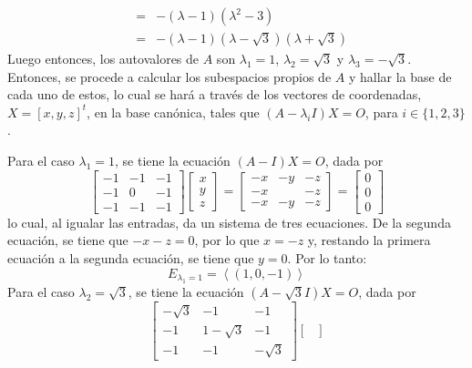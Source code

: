 \begin{solucion}
\begin{eqnarray*}
  & = & -(\lambda-1)(\lambda^2-3) \\ 
  & = & -(\lambda - 1)(\lambda - \sqrt{3})(\lambda + \sqrt{3})
 \end{eqnarray*}
 Luego entonces, los autovalores de $A$ son $\lambda_1 = 1$, $\lambda_2 = \sqrt{3}$ y $\lambda_3 = -\sqrt{3}$. Entonces, se procede a calcular los subespacios propios de $A$ y hallar la base de cada uno de estos, lo cual se har\'a a trav\'es de los vectores de coordenadas, $X=[x,y,z]^t$, en la base can\'onica, tales que $(A-\lambda_i I)X = O$, para $i \in \{ 1,2,3 \}$.
 \par 
 Para el caso $\lambda_1 = 1$, se tiene la ecuaci\'on $(A-I)X = O$, dada por
 \begin{equation*}
  \begin{bmatrix}
   -1 & -1 & -1 \\
   -1 &  0 & -1 \\
   -1 & -1 & -1
  \end{bmatrix}
  \begin{bmatrix}
   x \\ y \\ z
  \end{bmatrix}
  = 
  \begin{bmatrix}
   -x & -y & -z \\
   -x &    & -z \\
   -x & -y & -z
  \end{bmatrix}
  = 
  \begin{bmatrix}
   0 \\ 0 \\ 0
  \end{bmatrix}
 \end{equation*}
 lo cual, al igualar las entradas, da un sistema de tres ecuaciones. De la segunda ecuaci\'on, se tiene que $-x-z =0$, por lo que $x=-z$ y, restando la primera ecuaci\'on a la segunda ecuaci\'on, se tiene que $y=0$. Por lo tanto:
 \begin{equation*}
  E_{\lambda_1 = 1} = \left< (1,0,-1) \right>
 \end{equation*}
 Para el caso $\lambda_2 = \sqrt{3}$, se tiene la ecuaci\'on $(A-\sqrt{3}I)X = O$, dada por
 \begin{equation*}
  \begin{bmatrix}
   -\sqrt{3} & -1 & -1 \\
   -1 &  1-\sqrt{3} & -1 \\
   -1 & -1 & -\sqrt{3}
  \end{bmatrix}
  \begin{bmatrix}

\end{bmatrix}
\end{equation*}
\end{solucion}
